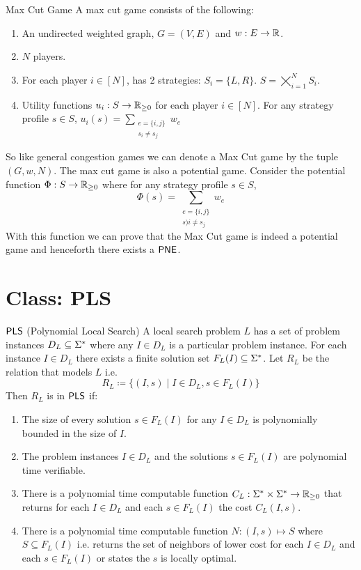 \begin{Definition}{Max Cut Game}{}
	A max cut game consists of the following:
	\begin{enumerate}[itemsep=-1mm]
		\item An undirected weighted graph, $G=(V,E)$ and $w:E\to\mathbb{R}$.
		\item $N$ players.
		\item For each player $i\in[N]$, has 2 strategies: $S_i=\{L,R\}$. $S=\bigtimes\limits_{i=1}^N S_i$.	
		\item Utility functions $u_i:S\to \mathbb{R}_{\geq 0}$ for each player $i\in[N]$. For any strategy profile $s\in S$,  $u_i(s)=\sum\limits_{\substack{e=\{i,j\}\\ s_i\neq s_j}}w_e$
	\end{enumerate}
\end{Definition}

So like general congestion games we can denote a Max Cut game by the tuple $(G,w,N)$. The max cut game is also a potential game. Consider the potential function $\Phi:S\to\mathbb{R}_{\geq 0}$ where for any strategy profile $s\in S$, $$\Phi(s)=\sum_{\substack{e=\{i,j\}\\ s)i\neq s_j}}w_e$$With this function we can prove that the Max Cut game is indeed a potential game and henceforth there exists a $\operatorname{\mathsf{PNE}}$.

\section{Class: \textsf{PLS}}
\begin{Definition}{$\operatorname{\mathsf{PLS}}$ (Polynomial Local Search)}{}
	A local search problem $L$ has a set of problem instances $D_L\subseteq \Sigma^*$ where any $I\in D_L$ is a particular problem instance. For each instance $I\in D_L$ there exists a finite solution set $F_L(I)\subseteq \Sigma^*$. Let $R_L$ be the relation that models $L$ i.e. $$R_L\coloneqq \{(I,s)\mid I\in D_L,s\in F_L(I)\}$$ Then $R_L$ is in $\operatorname{\mathsf{PLS}}$ if:\begin{enumerate}[label=(\roman*)]
		\item The size of every solution $s\in F_L(I)$ for any $I\in D_L$ is polynomially bounded in the size of $I$.
		\item The problem instances $I\in D_L$ and the solutions $s\in F_L(I)$ are polynomial time verifiable.
		\item There is a polynomial time computable function $C_L:\Sigma^*\times \Sigma^*\to \mathbb{R}_{\geq 0}$ that returns for each $I\in D_L$ and each $s\in F_L(I)$ the cost $C_L(I,s)$.
		\item There is a polynomial time computable function $N:(I,s)\mapsto S$ where $S\subseteq F_L(I)$ i.e. returns the set of neighbors of lower cost for each $I\in D_L$ and each $s\in F_L(I)$ or states the $s$ is locally optimal.
	\end{enumerate}
\end{Definition}

